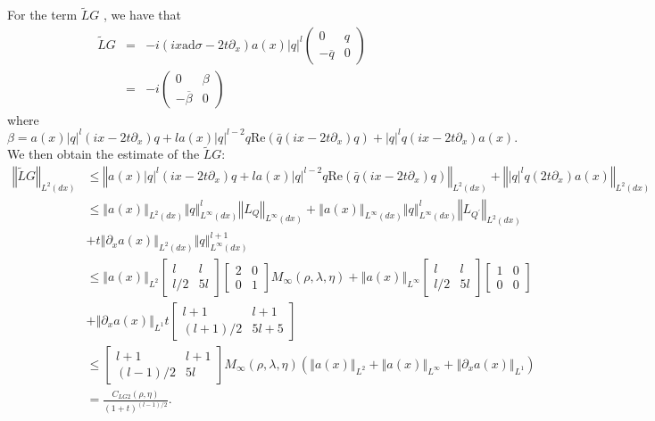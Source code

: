 \documentclass{amsart}
\theoremstyle{plain}
\theoremstyle{remark}
\numberwithin{equation}{section}
\newcommand{\norm}[2]{\left\Vert #1\right\Vert_{#2}}
\newcommand{\twomat}[4]
{
\left(
	\begin{array}{cc}
		{#1}	&	{#2}	\\[10pt]
		{#3}	&	{#4}
		\end{array}
\right)
}
\newcommand{\Twomat}[4]
{
\left[
	\begin{array}{cc}
		{#1}	&	{#2}	\\[10pt]
		{#3}	&	{#4}
		\end{array}
\right]
}
\begin{document}
For the term $\tilde{L}G$ , we have that
\begin{eqnarray*}
\widetilde{L}G &=&-i\left( ix\mathrm{ad}\sigma-2t\partial_{x}\right) a\left(
x\right) \left\vert q\right\vert^{l}\twomat{0}{q}{-\overline{q}}{0}  \\
&=&-i\twomat{0}{\beta}{-\overline{\beta}}{0}
\end{eqnarray*}
where
\begin{equation}
\beta =a\left( x\right) \left\vert q\right\vert ^{l}\left(
ix-2t\partial _{x}\right) q+la\left( x\right) \left\vert q\right\vert ^{l-2}q%
\mathrm{Re}\left(\bar{q}\left( ix-2t\partial_{x}\right) q\right) +\left\vert q\right\vert ^{l}q\left( ix-2t\partial _{x}\right) a\left( x\right).
\end{equation}
We then obtain the estimate of the $\tilde{L}G$:
{\small \begin{align}
\label{est LG2}
\left\Vert \tilde{L}G\right\Vert _{L^{2}\left( dx\right) } &\leq \left\Vert
a\left( x\right) \left\vert q\right\vert ^{l}\left(ix-2t\partial
_{x}\right) q+la\left( x\right) \left\vert q\right\vert ^{l-2}q\mathrm{Re}
\left( \bar{q}\left( ix-2t\partial _{x}\right) q\right) \right\Vert
_{L^{2}\left( dx\right) }+\left\Vert \left\vert q\right\vert ^{l}q\left(
2t\partial _{x}\right) a\left( x\right) \right\Vert _{L^{2}\left(
dx\right) } \\
\nonumber
        &\leq \left\Vert a\left( x\right) \right\Vert _{L^{2}\left( dx\right)
}\left\Vert q\right\Vert _{L^{\infty }\left( dx\right) }^{l}\left\Vert
L_{Q}\right\Vert _{L^{\infty }\left( dx\right) }+\left\Vert a\left( x\right)
\right\Vert _{L^{\infty }\left( dx\right) }\left\Vert q\right\Vert
_{L^{\infty }\left( dx\right) }^{l}\left\Vert L_{Q^{\prime }}\right\Vert
_{L^{2}\left( dx\right) }\\
\nonumber
 & + t\left\Vert \partial _{x}a\left( x\right) \right\Vert
_{L^{2}\left( dx\right) }\left\Vert q\right\Vert _{L^{\infty }\left(
dx\right) }^{l+1} \\
\nonumber
&\leq \norm{ a(x)}{L^2} \Twomat{l}{l}{l/2}{5l}\Twomat{2}{0}{0}{1}M_{\infty}(\rho,\lambda, \eta) + \norm{a(x)}{L^\infty} \Twomat{l}{l}{l/2}{5l}\Twomat{1}{0}{0}{0} \\
\nonumber
&+ \norm{\partial_x a(x)}{L^1} t\Twomat{l+1}{l+1}{(l+1)/2}{5l+5}\\
\nonumber
&\leq  \Twomat{l+1}{l+1}{(l-1)/2}{5l}M_{\infty}(\rho,\lambda, \eta)\left(\norm{ a(x)}{L^2}+ \norm{a(x)}{L^\infty} +\norm{\partial_x a(x)}{L^1}\right)\\
\nonumber
&= \frac{C_{LG2}(\rho, \eta)}{(1+t)^{(l-1)/2}}.
\end{align}}
\end{document}
